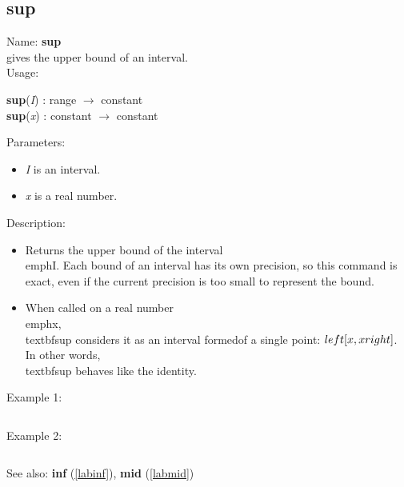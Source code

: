 \subsection{sup}
\label{labsup}
\noindent Name: \textbf{sup}\\
gives the upper bound of an interval.\\
\noindent Usage: 
\begin{center}
\textbf{sup}(\emph{I}) : \textsf{range} $\rightarrow$ \textsf{constant}\\
\textbf{sup}(\emph{x}) : \textsf{constant} $\rightarrow$ \textsf{constant}\\
\end{center}
Parameters: 
\begin{itemize}
\item \emph{I} is an interval.
\item \emph{x} is a real number.
\end{itemize}
\noindent Description: \begin{itemize}

\item Returns the upper bound of the interval \\emph{I}. Each bound of an interval has its \n   own precision, so this command is exact, even if the current precision is too \n   small to represent the bound.\n
\item When called on a real number \\emph{x}, \\textbf{sup} considers it as an interval formed\n   of a single point: $\\left[ x, x \\right]$. In other words, \\textbf{sup} behaves like the identity.\n\end{itemize}
\noindent Example 1: 
\begin{center}\begin{minipage}{15cm}\begin{Verbatim}[frame=single]
\end{Verbatim}
\end{minipage}\end{center}
\noindent Example 2: 
\begin{center}\begin{minipage}{15cm}\begin{Verbatim}[frame=single]
\end{Verbatim}
\end{minipage}\end{center}
See also: \textbf{inf} (\ref{labinf}), \textbf{mid} (\ref{labmid})
